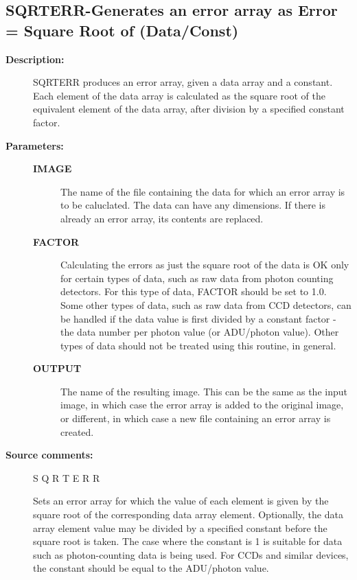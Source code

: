 \subsection{SQRTERR-\label{SQRTERR}Generates an error array as Error = Square Root of (Data/Const)}
\begin{description}

\item [\textbf{Description:}]
 SQRTERR produces an error array, given a data array and a
 constant.  Each element of the data array is calculated as
 the square root of the equivalent element of the data array,
 after division by a specified constant factor.

\item [\textbf{Parameters:}]
\begin{description}
\item [\textbf{IMAGE}]
 The name of the file containing the data
 for which an error array is to be caluclated.  The
 data can have any dimensions.  If there is already
 an error array, its contents are replaced.
\item [\textbf{FACTOR}]
 Calculating the errors as just the square root of
 the data is OK only for certain types of data, such
 as raw data from photon counting detectors.  For this
 type of data, FACTOR should be set to 1.0.  Some other
 types of data, such as raw data from CCD detectors,
 can be handled if the data value is first divided by
 a constant factor - the data number per photon value (or
 ADU/photon value).  Other types of data should not be
 treated using this routine, in general.
\item [\textbf{OUTPUT}]
 The name of the resulting image.  This
 can be the same as the input image, in which case the
 error array is added to the original image, or different,
 in which case a new file containing an error array is
 created.
\end{description}

\item [\textbf{Source comments:}]
\begin{terminalv}
 S Q R T E R R

 Sets an error array for which the value of each element is
 given by the square root of the corresponding data array
 element.  Optionally, the data array element value may be divided
 by a specified constant before the square root is taken.  The
 case where the constant is 1 is suitable for data such as
 photon-counting data is being used.  For CCDs and similar devices,
 the constant should be equal to the ADU/photon value.


\end{terminalv}
\end{description}

